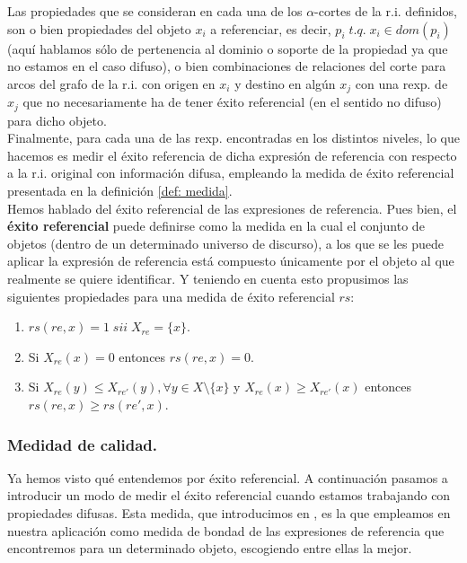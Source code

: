 \documentclass[10pt,a4paper]{article}
\begin{document}
Las propiedades que se consideran en cada una de los $\alpha$-cortes de la r.i. definidos, son o bien propiedades del objeto $x_i$ a referenciar, es decir, $p_i \; t.q. \; x_i \in dom(p_i)$ (aquí hablamos sólo de pertenencia al dominio o soporte de la propiedad ya que no estamos en el caso difuso), o bien combinaciones de relaciones del corte para arcos del grafo de la r.i. con origen en $x_i$ y destino en algún $x_j$ con una rexp. de $x_j$ que no necesariamente ha de tener éxito referencial (en el sentido no difuso) para dicho objeto.\\

Finalmente, para cada una de las rexp. encontradas en los distintos niveles, lo que hacemos es medir el éxito referencia de dicha expresión de referencia con respecto a la r.i. original con información difusa, empleando la medida de éxito referencial presentada en la definición \ref{def: medida}.\\

Hemos hablado del éxito referencial de las expresiones de referencia. Pues bien, el \textbf{éxito referencial} puede definirse como la medida en la cual el conjunto de objetos (dentro de un determinado universo de discurso), a los que se les puede aplicar la expresión de referencia está compuesto únicamente por el objeto al que realmente se quiere identificar. Y teniendo en cuenta esto propusimos las siguientes propiedades para una medida de éxito referencial $rs$:

\begin{enumerate}
\item $rs(re, x) = 1 \; sii \; X_{re} = \lbrace x \rbrace$.
\item Si $X_{re}(x) = 0$ entonces $rs(re, x) = 0$.
\item Si $X_{re}(y) \leq X_{re'}(y), \forall y \in X\setminus\lbrace x\rbrace$ y $X_{re}(x) \geq X_{re'}(x)$ entonces $rs(re, x) \geq rs(re', x)$.
\end{enumerate}

\subsubsection{Medidad de calidad.}

Ya hemos visto qué entendemos por éxito referencial. A continuación pasamos a introducir un modo de medir el éxito referencial cuando estamos trabajando con propiedades difusas. Esta medida, que introducimos en \cite{artReferentialSuccessCuts}, es la que empleamos en nuestra aplicación como medida de bondad de las expresiones de referencia que encontremos para un determinado objeto, escogiendo entre ellas la mejor.\\
\end{document}
